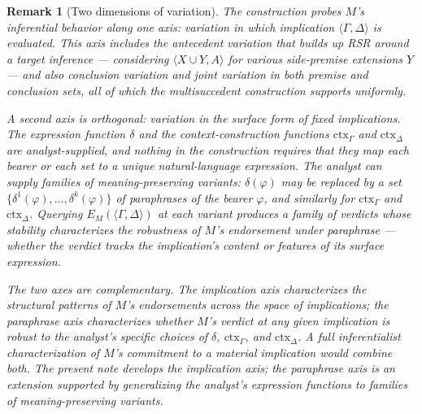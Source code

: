 \documentclass[11pt]{article}
\newtheorem{remark}{Remark}
\begin{document}
\begin{remark}[Two dimensions of variation]
The construction probes $M$'s inferential behavior along one axis: variation in which implication $\langle \Gamma, \Delta \rangle$ is evaluated. This axis includes the antecedent variation that builds up RSR around a target inference --- considering $\langle X \cup Y, A \rangle$ for various side-premise extensions $Y$ --- and also conclusion variation and joint variation in both premise and conclusion sets, all of which the multisuccedent construction supports uniformly.

A second axis is orthogonal: variation in the surface form of fixed implications. The expression function $\delta$ and the context-construction functions $\mathrm{ctx}_\Gamma$ and $\mathrm{ctx}_\Delta$ are analyst-supplied, and nothing in the construction requires that they map each bearer or each set to a unique natural-language expression. The analyst can supply families of meaning-preserving variants: $\delta(\varphi)$ may be replaced by a set $\{\delta^1(\varphi), \ldots, \delta^k(\varphi)\}$ of paraphrases of the bearer $\varphi$, and similarly for $\mathrm{ctx}_\Gamma$ and $\mathrm{ctx}_\Delta$. Querying $E_M(\langle \Gamma, \Delta \rangle)$ at each variant produces a family of verdicts whose stability characterizes the robustness of $M$'s endorsement under paraphrase --- whether the verdict tracks the implication's content or features of its surface expression.

The two axes are complementary. The implication axis characterizes the structural patterns of $M$'s endorsements across the space of implications; the paraphrase axis characterizes whether $M$'s verdict at any given implication is robust to the analyst's specific choices of $\delta$, $\mathrm{ctx}_\Gamma$, and $\mathrm{ctx}_\Delta$. A full inferentialist characterization of $M$'s commitment to a material implication would combine both. The present note develops the implication axis; the paraphrase axis is an extension supported by generalizing the analyst's expression functions to families of meaning-preserving variants.
\end{remark}

\end{document}

